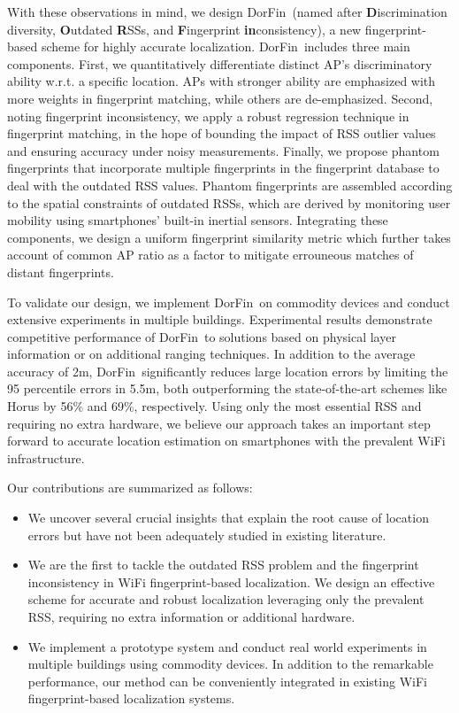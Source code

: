 \documentclass[10pt,conference,compsocconf,letterpaper]{./sty/IEEEtran}
\newcommand{\empha}[1]{{\bf #1}}
\def\sysname{DorFin}
\newcommand{\rev}[1]{{\color{blue}#1}} \newcommand{\com}[1]{\textbf{\color{red}(COMMENT: #1)}} \else
\newcommand{\rev}[1]{#1}
\newcommand{\com}[1]{}
\begin{document}
With these observations in mind, we design \sysname~(named after \empha{D}iscrimination diversity, \empha{O}utdated \empha{R}SSs, and \empha{F}ingerprint \empha{in}consistency), a new fingerprint-based scheme for highly accurate localization. \sysname~includes three main components.
First, we quantitatively differentiate distinct AP's \rev{discriminatory ability w.r.t. a specific location}. \rev{APs with stronger ability are emphasized with more weights in fingerprint matching, while others are de-emphasized}. 
Second, noting fingerprint inconsistency, we apply a robust regression technique in fingerprint matching, in the hope of bounding the impact of RSS outlier values and ensuring accuracy under noisy measurements.
Finally, we propose phantom fingerprints that incorporate multiple \rev{fingerprints} in the fingerprint database to deal with the outdated RSS values. Phantom fingerprints are assembled according to the spatial constraints of outdated RSSs, which are derived by monitoring user mobility using smartphones' built-in inertial sensors.
Integrating these components, we design a uniform fingerprint similarity metric which further takes account of common AP ratio as a factor to mitigate \rev{errouneous matches of distant fingerprints}.

To validate our design, we implement \sysname~on commodity devices and conduct extensive experiments in multiple buildings. Experimental results demonstrate competitive performance of \sysname~to solutions based on physical layer information or on additional ranging techniques. In addition to the average accuracy of 2m, \sysname~significantly reduces large location errors by limiting the 95 percentile errors in 5.5m, both outperforming the state-of-the-art schemes like Horus by 56\% and 69\%, respectively. Using only the most essential RSS and requiring no extra hardware, we believe our approach takes an important step forward to accurate location estimation on smartphones with the prevalent WiFi infrastructure.

Our contributions are summarized as follows:
\begin{itemize}
	\item We uncover several crucial insights that explain the root cause of location errors but have not been adequately studied in existing literature. 
\item We are the first to tackle the outdated RSS problem and the fingerprint inconsistency in WiFi fingerprint-based localization. We design an effective scheme for accurate and robust localization leveraging only the \rev{prevalent RSS}, requiring no extra information or additional hardware. 
	\item We implement a prototype system and conduct real world experiments in multiple buildings using commodity devices. \rev{In addition to the remarkable performance}, our method can be conveniently integrated in existing WiFi fingerprint-based localization systems.
\end{itemize}
\end{document}
